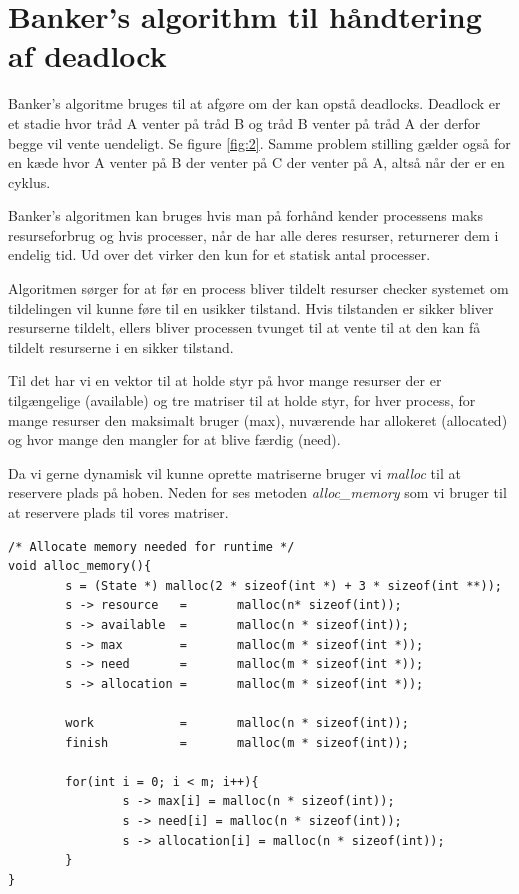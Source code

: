 \documentclass[danish]{report}
\begin{document}
\chapter{Banker’s algorithm til håndtering af deadlock}

Banker's algoritme bruges til at afgøre om der kan opstå deadlocks. Deadlock er et stadie hvor tråd A venter på tråd B og tråd B venter på tråd A der derfor begge vil vente uendeligt. Se figure \ref{fig:2}. Samme problem stilling gælder også for en kæde hvor A venter på B der venter på C der venter på A, altså når der er en cyklus.

Banker's algoritmen kan bruges hvis man på forhånd kender processens maks resurseforbrug og hvis processer, når de har alle deres resurser, returnerer dem i endelig tid. Ud over det virker den kun for et statisk antal processer.


Algoritmen sørger for at før en process bliver tildelt resurser checker systemet om tildelingen vil kunne føre til en usikker tilstand. Hvis tilstanden er sikker bliver resurserne tildelt, ellers bliver processen tvunget til at vente til at den kan få tildelt resurserne i en sikker tilstand.

Til det har vi en vektor til at holde styr på hvor mange resurser der er tilgængelige (available) og tre matriser til at holde styr, for hver process, for mange resurser den maksimalt bruger (max), nuværende har allokeret (allocated) og hvor mange den mangler for at blive færdig (need).

Da vi gerne dynamisk vil kunne oprette matriserne bruger vi \textit{malloc} 
til at reservere plads på hoben. Neden for ses metoden \textit{alloc\_memory} som vi bruger til at reservere plads til vores matriser. 

\begin{lstlisting}
/* Allocate memory needed for runtime */
void alloc_memory(){
        s = (State *) malloc(2 * sizeof(int *) + 3 * sizeof(int **));
        s -> resource   =       malloc(n* sizeof(int));
        s -> available  =       malloc(n * sizeof(int));
        s -> max        =       malloc(m * sizeof(int *));
        s -> need       =       malloc(m * sizeof(int *));
        s -> allocation =       malloc(m * sizeof(int *));

        work            =       malloc(n * sizeof(int));
        finish          =       malloc(m * sizeof(int));

        for(int i = 0; i < m; i++){
                s -> max[i] = malloc(n * sizeof(int));
                s -> need[i] = malloc(n * sizeof(int));
                s -> allocation[i] = malloc(n * sizeof(int));
        }
}
\end{lstlisting}
\end{document}
